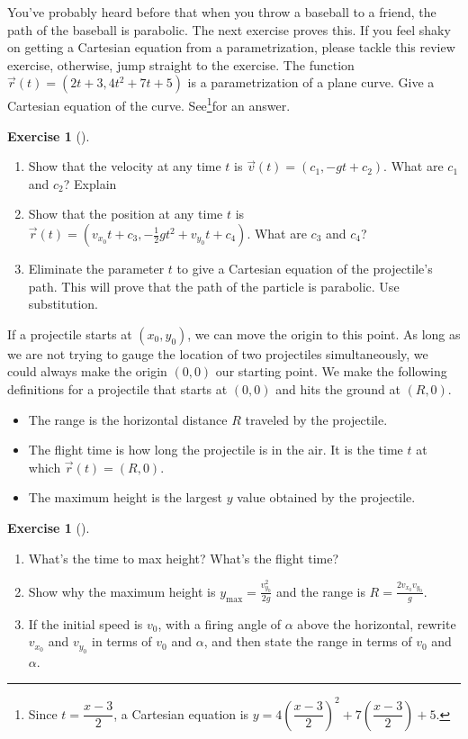 \documentclass[10pt,]{book}
\theoremstyle{plain}
\theoremstyle{definition}
\theoremstyle{definition}
\theoremstyle{definition}
\theoremstyle{definition}
\newtheorem{exploration}[project]{Exercise}
\theoremstyle{definition}
\numberwithin{equation}{section}
\newcommand{\ds}{\displaystyle}
\begin{document}
%
\par
You've probably heard before that when you throw a baseball to a friend, the path of the baseball is parabolic. The next exercise proves this. If you feel shaky on getting a Cartesian equation from a parametrization, please tackle this review exercise, otherwise, jump straight to the exercise.%
The function \(\vec r(t) = (2t+3, 4t^2+7t+5)\) is a parametrization of a plane curve. Give a Cartesian equation of the curve. See\footnote{Since \(t=\dfrac{x-3}{2}\), a Cartesian equation is \(y = 4\left(\dfrac{x-3}{2}\right)^2+7\left(\dfrac{x-3}{2}\right)+5\).\label{fn-7}}for an answer.%
\begin{exploration}[]\label{exploration-161}
\leavevmode%
\begin{enumerate}[font=\bfseries,label=(\alph*),ref=\alph*]
\item\label{task-373} Show that the velocity at any time \(t\) is \(\vec v(t) = (c_1,-gt+c_2)\). What are \(c_1\) and \(c_2\)? Explain%
\item\label{task-374} Show that the position at any time \(t\) is \(\vec r(t) = (v_{x_0}t+c_3, -\frac{1}{2}gt^2+v_{y_0}t+c_4)\). What are \(c_3\) and \(c_4\)?%
\item\label{task-375} Eliminate the parameter \(t\) to give a Cartesian equation of the projectile's path. This will prove that the path of the particle is parabolic. Use substitution.%
%
\end{enumerate}
\end{exploration}
If a projectile starts at \((x_0,y_0)\), we can move the origin to this point. As long as we are not trying to gauge the location of two projectiles simultaneously, we could always make the origin \((0,0)\) our starting point. We make the following definitions for a projectile that starts at \((0,0)\) and hits the ground at \((R,0)\). \leavevmode%
\begin{itemize}[label=\textbullet]
\item{}The range is the horizontal distance \(R\) traveled by the projectile.%
\item{}The flight time is how long the projectile is in the air. It is the time \(t\) at which \(\vec r(t)=(R,0)\).%
\item{}The maximum height is the largest \(y\) value obtained by the projectile.%
\end{itemize}
%
\begin{exploration}[]\label{exploration-162}
\leavevmode%
\begin{enumerate}[font=\bfseries,label=(\alph*),ref=\alph*]
\item\label{task-376} What's the time to max height?  What's the flight time?%
\item\label{task-377} Show why the maximum height is \(\ds y_{\max}=\frac{v_{y_0}^2}{2g}\) and the range is \(\ds R=\frac{2v_{x_0}v_{y_0}}{g}\).%
\item\label{task-378} If the initial speed is \(v_0\), with a firing angle of \(\alpha\) above the horizontal, rewrite \(v_{x_0}\) and \(v_{y_0}\) in terms of \(v_0\) and \(\alpha\), and then state the range in terms of \(v_0\) and \(\alpha\).%
\end{enumerate}
\end{exploration}
\end{document}
